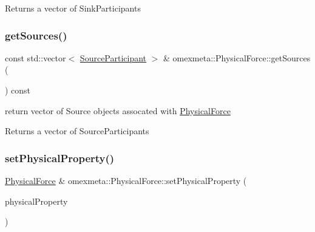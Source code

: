 \begin{DoxyReturn}{Returns}
a vector of Sink\+Participants 
\end{DoxyReturn}
\mbox{\label{classomexmeta_1_1PhysicalForce_aa42b8e04573d2ae88f952c76b146d5ac}} 
\subsubsection{\texorpdfstring{get\+Sources()}{getSources()}}
{\footnotesize\ttfamily const std\+::vector$<$ \hyperlink{classomexmeta_1_1SourceParticipant}{Source\+Participant} $>$ \& omexmeta\+::\+Physical\+Force\+::get\+Sources (\begin{DoxyParamCaption}{ }\end{DoxyParamCaption}) const}



return vector of Source objects assocated with \hyperlink{classomexmeta_1_1PhysicalForce}{Physical\+Force} 

\begin{DoxyReturn}{Returns}
a vector of Source\+Participants 
\end{DoxyReturn}
\mbox{\label{classomexmeta_1_1PhysicalForce_a081aecc43d16b2fc8826c4050eb2055d}} 
\subsubsection{\texorpdfstring{set\+Physical\+Property()}{setPhysicalProperty()}\hspace{0.1cm}{\footnotesize\ttfamily [1/2]}}
{\footnotesize\ttfamily \hyperlink{classomexmeta_1_1PhysicalForce}{Physical\+Force} \& omexmeta\+::\+Physical\+Force\+::set\+Physical\+Property (\begin{DoxyParamCaption}\item[{\hyperlink{classomexmeta_1_1PhysicalProperty}{Physical\+Property}}]{physical\+Property }\end{DoxyParamCaption})}



